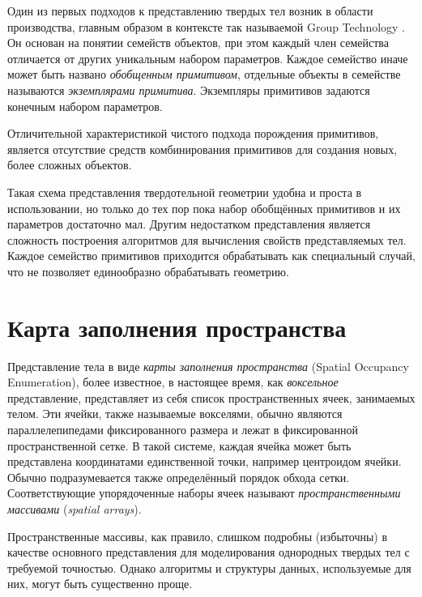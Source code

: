 Один из первых подходов к представлению твердых тел возник в области производства, главным образом в контексте так называемой Group Technology \cite{Gall73}. Он основан на понятии семейств объектов, при этом каждый член семейства отличается от других уникальным набором параметров. Каждое семейство иначе может быть названо \textit{обобщенным примитивом}, отдельные объекты в семействе называются \textit{экземплярами примитива}. Экземпляры примитивов задаются конечным набором параметров.

Отличительной характеристикой чистого подхода порождения примитивов, является отсутствие средств комбинирования примитивов для создания новых, более сложных объектов.

Такая схема представления твердотельной геометрии удобна и проста в использовании, но только до тех пор пока набор обобщённых примитивов и их параметров достаточно мал. Другим недостатком представления является сложность построения алгоритмов для вычисления свойств представляемых тел. Каждое семейство примитивов приходится обрабатывать как специальный случай, что не позволяет единообразно обрабатывать геометрию.

\section{Карта заполнения пространства} \label{sect_spatial_occupancy_enum}

Представление тела в виде \textit{карты заполнения пространства} (Spatial Occupancy Enumeration), более известное, в настоящее время, как \textit{воксельное} представление, представляет из себя список пространственных ячеек, занимаемых телом. Эти ячейки, также называемые вокселями, обычно являются параллелепипедами фиксированного размера и лежат в фиксированной пространственной сетке. В такой системе, каждая ячейка может быть представлена координатами единственной точки, например центроидом ячейки. Обычно подразумевается также определённый порядок обхода сетки. Соответствующие упорядоченные наборы ячеек называют \textit{пространственными массивами} (\textit{spatial arrays}).

Пространственные массивы, как правило, слишком подробны (избыточны) в качестве основного представления для моделирования однородных твердых тел с требуемой точностью. Однако алгоритмы и структуры данных, используемые для них, могут быть существенно проще.

